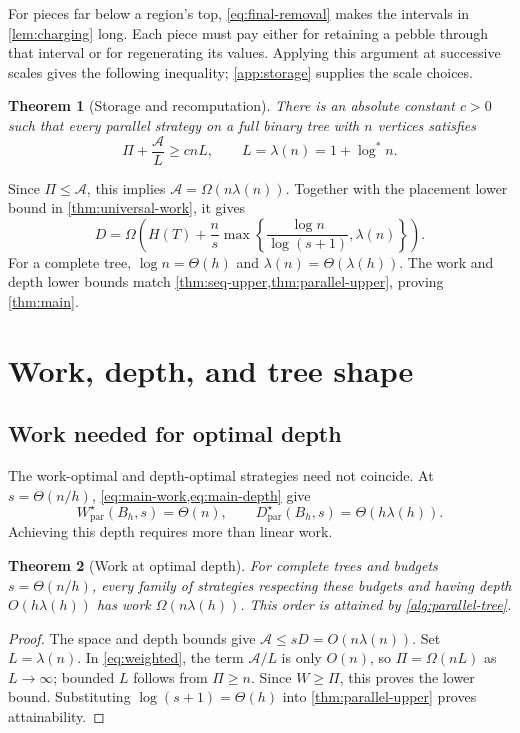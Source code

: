 \documentclass[11pt]{article}
\newtheorem{theorem}{Theorem}[section]
\theoremstyle{definition}
\theoremstyle{remark}
\newcommand{\Area}{\mathcal A}
\newcommand{\Wpar}{W_{\mathrm{par}}}
\newcommand{\Dpar}{D_{\mathrm{par}}}
\begin{document}
For pieces far below a region's top, \cref{eq:final-removal} makes the intervals in \cref{lem:charging} long. Each piece must pay either for retaining a pebble through that interval or for regenerating its values. Applying this argument at successive scales gives the following inequality; \cref{app:storage} supplies the scale choices.

\begin{theorem}[Storage and recomputation]
\label{thm:weighted}
There is an absolute constant $c>0$ such that every parallel strategy on a full binary tree with $n$ vertices satisfies
\begin{equation}
\Pi+\frac{\Area}{L}\ge cnL, \qquad L=\lambda(n)=1+\log^*n.
\label{eq:weighted}
\end{equation}
\end{theorem}

Since $\Pi\le\Area$, this implies $\Area=\Omega(n\lambda(n))$. Together with the placement lower bound in \cref{thm:universal-work}, it gives
\begin{equation}
D=\Omega\!\left(H(T)+\frac ns\max\!\left\{\frac{\log n}{\log(s+1)},\lambda(n)\right\}\right).
\label{eq:universal-depth}
\end{equation}
For a complete tree, $\log n=\Theta(h)$ and $\lambda(n)=\Theta(\lambda(h))$. The work and depth lower bounds match \cref{thm:seq-upper,thm:parallel-upper}, proving \cref{thm:main}.

\section{Work, depth, and tree shape}

\subsection{Work needed for optimal depth}
\label{sec:separation}

The work-optimal and depth-optimal strategies need not coincide. At $s=\Theta(n/h)$, \cref{eq:main-work,eq:main-depth} give
\[
\Wpar^\star(B_h,s)=\Theta(n), \qquad \Dpar^\star(B_h,s)=\Theta(h\lambda(h)).
\]
Achieving this depth requires more than linear work.

\begin{theorem}[Work at optimal depth]
\label{thm:separation}
For complete trees and budgets $s=\Theta(n/h)$, every family of strategies respecting these budgets and having depth $O(h\lambda(h))$ has work $\Omega(n\lambda(h))$. This order is attained by \cref{alg:parallel-tree}.
\end{theorem}
\begin{proof}
The space and depth bounds give $\Area\le sD=O(n\lambda(n))$. Set $L=\lambda(n)$. In \cref{eq:weighted}, the term $\Area/L$ is only $O(n)$, so $\Pi=\Omega(nL)$ as $L\to\infty$; bounded $L$ follows from $\Pi\ge n$. Since $W\ge\Pi$, this proves the lower bound. Substituting $\log(s+1)=\Theta(h)$ into \cref{thm:parallel-upper} proves attainability.
\end{proof}
\end{document}
